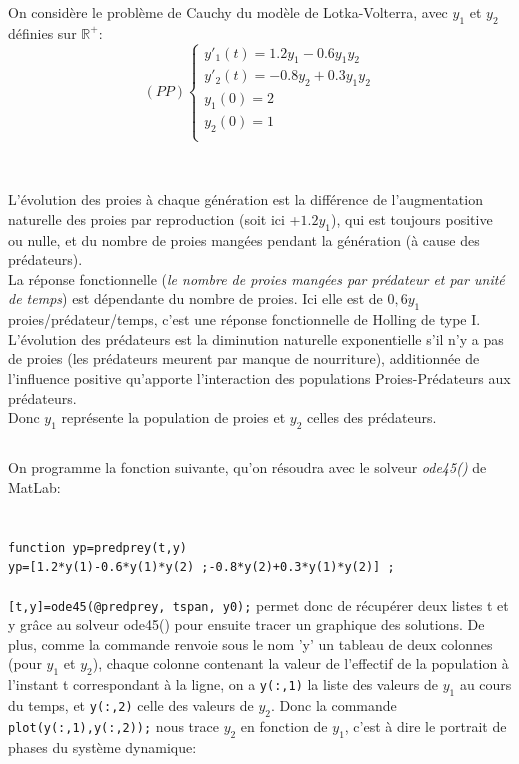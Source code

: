 \documentclass[a4paper,12pt,landscape]{article}
\begin{document}
On considère le problème de Cauchy du modèle de Lotka-Volterra, avec $y_1$ et $y_2$ définies sur $\mathbb{R}^+$:
$$
(PP)
\left \{
\begin{array}{l}
	y'_1(t)=1.2y_1-0.6y_1y_2\\
	y'_2(t)=-0.8y_2+0.3y_1y_2\\
	y_1(0)=2\\
	y_2(0)=1\\
\end{array}
\right.$$\\
\subsection{}

L'évolution des proies à chaque génération est la différence de l'augmentation naturelle des proies par reproduction (soit ici +$1.2y_1$), qui est toujours positive ou nulle, et du nombre de proies mangées pendant la génération (à cause des prédateurs).\\

La réponse fonctionnelle (\textit{le nombre de proies mangées par prédateur et par unité de temps}) est dépendante du nombre de proies. Ici elle est de $0,6y_1$ proies/prédateur/temps, c'est une réponse fonctionnelle de Holling de type I.\\

L'évolution des prédateurs est la diminution naturelle exponentielle s'il n'y a pas de proies (les prédateurs meurent par manque de nourriture), additionnée de l'influence positive qu'apporte l'interaction des populations Proies-Prédateurs aux prédateurs.\\

Donc $y_1$ représente la population de proies et $y_2$ celles des prédateurs.

\subsection{}

On programme la fonction suivante, qu'on résoudra avec le solveur \textit{ode45()} de MatLab:\\
 \\
 \\ 
\texttt{function yp=predprey(t,y)\\
yp=[1.2*y(1)-0.6*y(1)*y(2) ;-0.8*y(2)+0.3*y(1)*y(2)] ;}\\
 \\
\texttt{[t,y]=ode45(@predprey, tspan, y0);} permet donc de récupérer deux listes t et y grâce au solveur ode45() pour ensuite tracer un graphique des solutions.
De plus, comme la commande renvoie sous le nom 'y' un tableau de deux colonnes (pour $y_1$ et $y_2$), chaque colonne contenant la valeur de l'effectif de la population à l'instant t correspondant à la ligne, on a \texttt{y(:,1)} la liste des valeurs de $y_1$ au cours du temps, et \texttt{y(:,2)} celle des valeurs de $y_2$. Donc la commande \texttt{plot(y(:,1),y(:,2));} nous trace $y_2$ en fonction de $y_1$, c'est à dire le portrait de phases du système dynamique:
\end{document}
